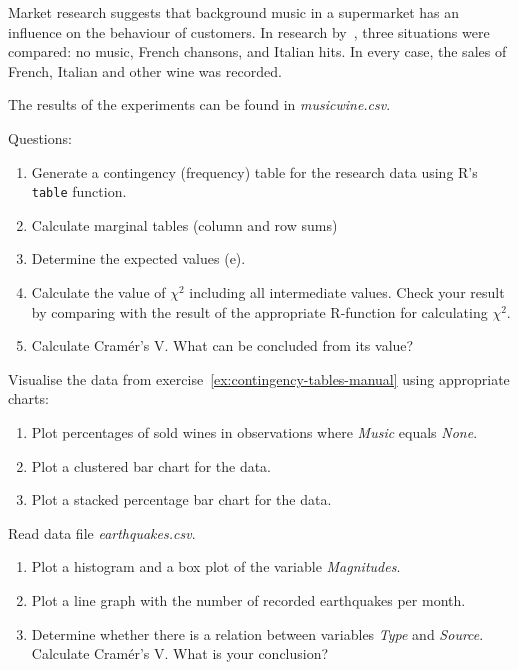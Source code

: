 \begin{exercise}
  \label{ex:contingency-tables-manual} %

  Market research suggests that background music in a supermarket has an influence on the behaviour of customers. In research by~\textcite{Ryan1998}, three situations were compared: no music, French chansons, and Italian hits. In every case, the sales of French, Italian and other wine was recorded.

  The results of the experiments can be found in \emph{musicwine.csv}. 
  
  Questions:
  
  \begin{enumerate}
    \item Generate a contingency (frequency) table for the research data using R's \texttt{table} function.
    \item Calculate marginal tables (column and row sums)
    \item Determine the expected values (e).
    \item Calculate the value of $\chi^{2}$ including all intermediate values. Check your result by comparing with the result of the appropriate R-function for calculating $\chi^{2}$.
    \item Calculate Cramér's V. What can be concluded from its value?
  \end{enumerate}
\end{exercise}

\begin{exercise}
  Visualise the data from exercise~\ref{ex:contingency-tables-manual} using appropriate charts:
  
  \begin{enumerate}
  \item Plot percentages of sold wines in observations where \emph{Music} equals \emph{None}.
  \item Plot a clustered bar chart for the data.
  \item Plot a stacked percentage bar chart for the data.
  \end{enumerate}
\end{exercise}

\begin{exercise}
  Read data file \emph{earthquakes.csv}.
  
  \begin{enumerate}
  \item Plot a histogram and a box plot of the variable \emph{Magnitudes}.
  \item Plot a line graph with the number of recorded earthquakes per month.
  \item Determine whether there is a relation between variables \emph{Type} and \emph{Source}. Calculate Cramér's V. What is your conclusion?
  \end{enumerate}
\end{exercise}

